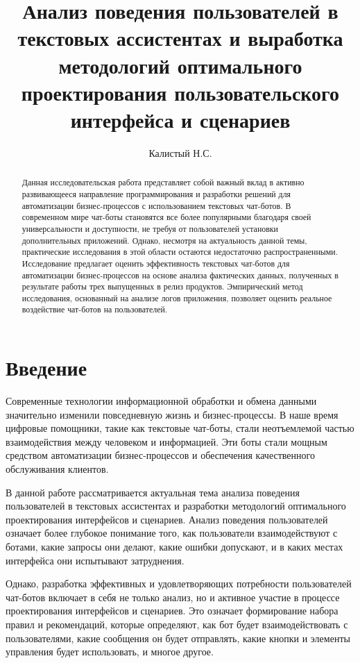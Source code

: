 \documentclass{article}
\title{Анализ поведения пользователей в текстовых ассистентах и выработка методологий оптимального проектирования пользовательского интерфейса и сценариев}
\author{Калистый Н.С.}
\begin{document}
\maketitle

\begin{abstract}
Данная исследовательская работа представляет собой важный вклад в активно развивающееся направление программирования и разработки решений для автоматизации бизнес-процессов с использованием текстовых чат-ботов. В современном мире чат-боты становятся все более популярными благодаря своей универсальности и доступности, не требуя от пользователей установки дополнительных приложений.
Однако, несмотря на актуальность данной темы, практические исследования в этой области остаются недостаточно распространенными. Исследование предлагает оценить эффективность текстовых чат-ботов для автоматизации бизнес-процессов на основе анализа фактических данных, полученных в результате работы трех выпущенных в релиз продуктов. Эмпирический метод исследования, основанный на анализе логов приложения, позволяет оценить реальное воздействие чат-ботов на пользователей.
\end{abstract}

\section{Введение}
Современные технологии информационной обработки и обмена данными значительно изменили повседневную жизнь и бизнес-процессы. В наше время цифровые помощники, такие как текстовые чат-боты, стали неотъемлемой частью взаимодействия между человеком и информацией. Эти боты стали мощным средством автоматизации бизнес-процессов и обеспечения качественного обслуживания клиентов.

В данной работе рассматривается актуальная тема анализа поведения пользователей в текстовых ассистентах и разработки методологий оптимального проектирования интерфейсов и сценариев. Анализ поведения пользователей означает более глубокое понимание того, как пользователи взаимодействуют с ботами, какие запросы они делают, какие ошибки допускают, и в каких местах интерфейса они испытывают затруднения.

Однако, разработка эффективных и удовлетворяющих потребности пользователей чат-ботов включает в себя не только анализ, но и активное участие в процессе проектирования интерфейсов и сценариев. Это означает формирование набора правил и рекомендаций, которые определяют, как бот будет взаимодействовать с пользователями, какие сообщения он будет отправлять, какие кнопки и элементы управления будет использовать, и многое другое.
\end{document}
